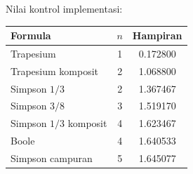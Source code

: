 \documentclass[book,english,noindex,lean,nobackpage,nocopyright,noupdate,nofiglist,notablist]{enacom}
\begin{document}
Nilai kontrol implementasi:
\begin{center}
\renewcommand{\arraystretch}{1.15}
\begin{tabularx}{0.92\textwidth}{X c c}
\hline
\textbf{Formula} & \textbf{$n$} & \textbf{Hampiran}\\\hline
Trapesium & 1 & 0.172800\\
Trapesium komposit & 2 & 1.068800\\
Simpson $1/3$ & 2 & 1.367467\\
Simpson $3/8$ & 3 & 1.519170\\
Simpson $1/3$ komposit & 4 & 1.623467\\
Boole & 4 & 1.640533\\
Simpson campuran & 5 & 1.645077\\
\hline
\end{tabularx}
\end{center}
\end{document}
